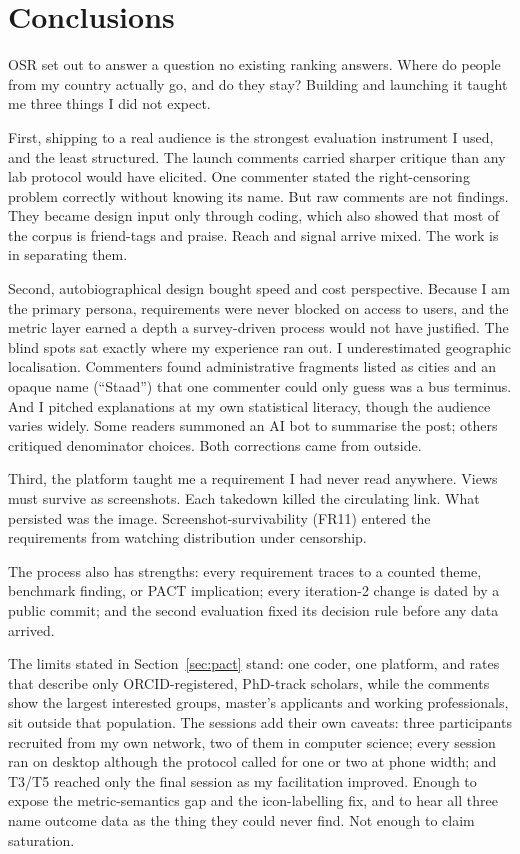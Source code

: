 \section{Conclusions}

OSR set out to answer a question no existing ranking answers. Where do people from my country actually go, and do they stay? Building and launching it taught me three things I did not expect.

First, shipping to a real audience is the strongest evaluation instrument I used, and the least structured. The launch comments carried sharper critique than any lab protocol would have elicited. One commenter stated the right-censoring problem correctly without knowing its name. But raw comments are not findings. They became design input only through coding, which also showed that most of the corpus is friend-tags and praise. Reach and signal arrive mixed. The work is in separating them.

Second, autobiographical design bought speed and cost perspective. Because I am the primary persona, requirements were never blocked on access to users, and the metric layer earned a depth a survey-driven process would not have justified. The blind spots sat exactly where my experience ran out. I underestimated geographic localisation. Commenters found administrative fragments listed as cities and an opaque name (``Staad'') that one commenter could only guess was a bus terminus. And I pitched explanations at my own statistical literacy, though the audience varies widely. Some readers summoned an AI bot to summarise the post; others critiqued denominator choices. Both corrections came from outside.

Third, the platform taught me a requirement I had never read anywhere. Views must survive as screenshots. Each takedown killed the circulating link. What persisted was the image. Screenshot-survivability (FR11) entered the requirements from watching distribution under censorship.

The process also has strengths: every requirement traces to a counted theme, benchmark finding, or PACT implication; every iteration-2 change is dated by a public commit; and the second evaluation fixed its decision rule before any data arrived.

The limits stated in Section~\ref{sec:pact} stand: one coder, one platform, and rates that describe only ORCID-registered, PhD-track scholars, while the comments show the largest interested groups, master's applicants and working professionals, sit outside that population. The sessions add their own caveats: three participants recruited from my own network, two of them in computer science; every session ran on desktop although the protocol called for one or two at phone width; and T3/T5 reached only the final session as my facilitation improved. Enough to expose the metric-semantics gap and the icon-labelling fix, and to hear all three name outcome data as the thing they could never find. Not enough to claim saturation.

